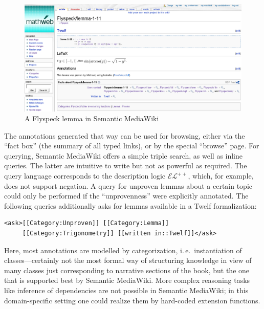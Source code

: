 \begin{figure}
  \centering
  \includegraphics[width=\textwidth]{smw-lemma}
  \caption[A Flyspeck lemma in Semantic MediaWiki]{A Flyspeck lemma in Semantic
    MediaWiki\protect\footnotemark}
  \label{fig:smw-lemma}
\end{figure}
\addtocounter{footnote}{-1}

The annotations generated that way can be used for browsing, either via the
``fact box'' (the summary of all typed links), or by the special ``browse''
page.  For querying, Semantic MediaWiki offers a simple triple search, as well
as inline queries.  The latter are intuitive to write but not as powerful as
required.  The query language corresponds to the description logic
$\mathcal{EL}^{++}$\cite{KrSchVr:semwiki-reasoning07}, which, for example, does
not support negation.  A query for unproven lemmas about a certain topic could
only be performed if the ``unprovenness'' were explicitly annotated.  The
following queries additionally asks for lemmas available in a Twelf formalization:

\begin{lstlisting}
<ask>[[Category:Unproven]] [[Category:Lemma]]
     [[Category:Trigonometry]] [[written in::Twelf]]</ask>
\end{lstlisting}

Here, most annotations are modelled by categorization, i.\,e.\ instantiation of
classes---certainly not the most formal way of structuring knowledge in view of
many classes just corresponding to narrative sections of the book, but the one
that is supported best by Semantic MediaWiki.  More complex reasoning tasks like
inference of dependencies are not possible in Semantic MediaWiki; in this
domain-specific setting one could realize them by hard-coded extension
functions.

